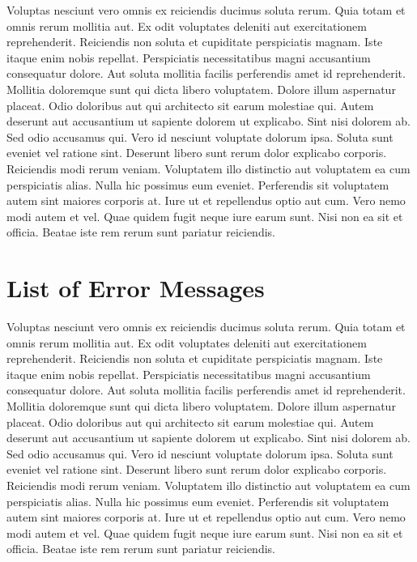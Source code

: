 \documentclass[
	11pt, %
	fleqn, %
	letterpaper, %
]{CommodoreBlueBook}
\begin{document}
Voluptas nesciunt vero omnis ex reiciendis ducimus soluta rerum. Quia totam et
omnis rerum mollitia aut. Ex odit voluptates deleniti aut exercitationem
reprehenderit. Reiciendis non soluta et cupiditate perspiciatis magnam. Iste
itaque enim nobis repellat. Perspiciatis necessitatibus magni accusantium
consequatur dolore. Aut soluta mollitia facilis perferendis amet id
reprehenderit. Mollitia doloremque sunt qui dicta libero voluptatem. Dolore
illum aspernatur placeat. Odio doloribus aut qui architecto sit earum molestiae
qui. Autem deserunt aut accusantium ut sapiente dolorem ut explicabo. Sint nisi
dolorem ab. Sed odio accusamus qui. Vero id nesciunt voluptate dolorum ipsa.
Soluta sunt eveniet vel ratione sint. Deserunt libero sunt rerum dolor
explicabo corporis. Reiciendis modi rerum veniam. Voluptatem illo distinctio
aut voluptatem ea cum perspiciatis alias. Nulla hic possimus eum eveniet.
Perferendis sit voluptatem autem sint maiores corporis at. Iure ut et
repellendus optio aut cum. Vero nemo modi autem et vel. Quae quidem fugit neque
iure earum sunt. Nisi non ea sit et officia. Beatae iste rem rerum sunt
pariatur reiciendis.

\chapter*{List of Error Messages}

Voluptas nesciunt vero omnis ex reiciendis ducimus soluta rerum. Quia totam et
omnis rerum mollitia aut. Ex odit voluptates deleniti aut exercitationem
reprehenderit. Reiciendis non soluta et cupiditate perspiciatis magnam. Iste
itaque enim nobis repellat. Perspiciatis necessitatibus magni accusantium
consequatur dolore. Aut soluta mollitia facilis perferendis amet id
reprehenderit. Mollitia doloremque sunt qui dicta libero voluptatem. Dolore
illum aspernatur placeat. Odio doloribus aut qui architecto sit earum molestiae
qui. Autem deserunt aut accusantium ut sapiente dolorem ut explicabo. Sint nisi
dolorem ab. Sed odio accusamus qui. Vero id nesciunt voluptate dolorum ipsa.
Soluta sunt eveniet vel ratione sint. Deserunt libero sunt rerum dolor
explicabo corporis. Reiciendis modi rerum veniam. Voluptatem illo distinctio
aut voluptatem ea cum perspiciatis alias. Nulla hic possimus eum eveniet.
Perferendis sit voluptatem autem sint maiores corporis at. Iure ut et
repellendus optio aut cum. Vero nemo modi autem et vel. Quae quidem fugit neque
iure earum sunt. Nisi non ea sit et officia. Beatae iste rem rerum sunt
pariatur reiciendis.
\end{document}
